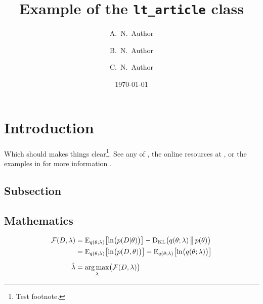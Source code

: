 \documentclass[a4paper, 11pt]{lt_article}
\title{Example of the \texttt{lt\_article} class}
\author[a,\corrmark]{A.~N.~Author}
\author[a,b]{B.~N.~Author}
\author[c]{C.~N.~Author}
\affiliation{Institution 1}
\affiliation{Institution 2}
\affiliation{Institution 3}
\date{\today}
\begin{document}
\maketitle
\printAffiliations

\begin{abstract} %

\blindtext

\end{abstract} %


\section{Introduction} %
\label{sec:Introduction}

\blindtext
Which should makes things clear\footnote{Test footnote.}.
See any of \textcite{Bayes}, the online resources at
, or the examples in
 for more information \autocite{GravitationalWaves}.

\subsection{Subsection} %

\blindtext

\begin{displayquote}
    \blindtext
\end{displayquote}

\blindtext

\subsection{Mathematics} %

\blindtext

\begin{equation}
\begin{split}
    \func{\FreeEnergy}{D, \lambda}
    & = \expecWRT{ \lnFunc{\cDist{p}{D}{\theta}} }{ \pDist{q}{\theta}{\lambda} }
    - \DKL{ \pDist{q}{\theta}{\lambda} }{ \dist{p}{\theta} }
    \\
    & = \expecWRT{ \lnFunc{\dist{p}{D, \theta}} }{ \pDist{q}{\theta}{\lambda} }
    - \expecWRT{ \lnFunc{\pDist{q}{\theta}{\lambda}} }{ \pDist{q}{\theta}{\lambda} }
    \\[5pt]
    \hat{\lambda}
    & = \Func{ \argmax_{\lambda} }{ \func{\FreeEnergy}{D, \lambda} }
\end{split}
\end{equation}
\end{document}
